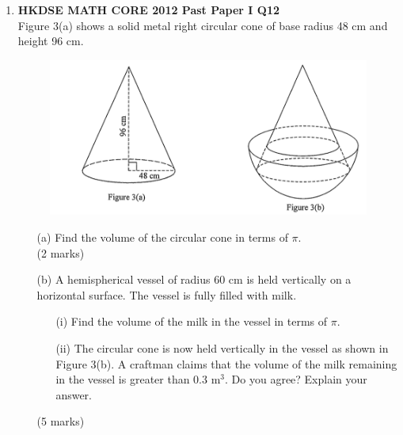 \documentclass[12pt]{article}
\begin{document}
\begin{enumerate}
	\item \textbf{HKDSE MATH CORE 2012 Past Paper I Q12}\\
	Figure 3(a) shows a solid metal right circular cone of base radius 48 cm and height 96 cm.
	\begin{figure}[H]
		\centering
		\includegraphics[width = .3\linewidth]{2012Figure1.3}
	\end{figure}
	\begin{enumerate}
		\item[(a)] Find the volume of the circular cone in terms of $\pi$. \\(2 marks)
		\item[(b)] A hemispherical vessel of radius 60 cm is held vertically on a horizontal surface. The vessel is fully filled with milk.
		\begin{enumerate}
			\item[(i)] Find the volume of the milk in the vessel in terms of $\pi$.
			\item[(ii)] The circular cone is now held vertically in the vessel as shown in Figure 3(b). A craftman claims that the volume of the milk remaining in the vessel is greater than 0.3 m$^3$. Do you agree? Explain your answer. 
		\end{enumerate}
		(5 marks)
	\end{enumerate}


\end{enumerate}
\end{document}
